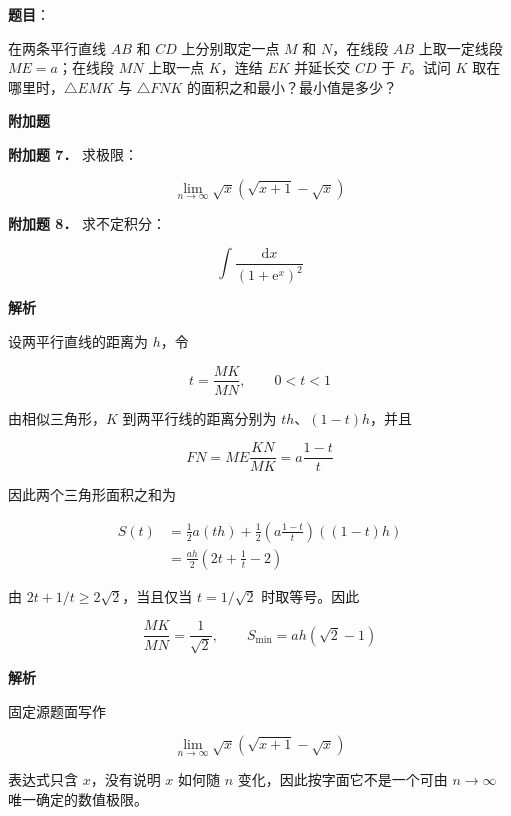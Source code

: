 \begin{answer}

\textbf{题目}：

在两条平行直线 $AB$ 和 $CD$ 上分别取定一点 $M$ 和 $N$，在线段 $AB$ 上取一定线段 $ME=a$；在线段 $MN$ 上取一点 $K$，连结 $EK$ 并延长交 $CD$ 于 $F$。试问 $K$ 取在哪里时，$\triangle EMK$ 与 $\triangle FNK$ 的面积之和最小？最小值是多少？

\begin{gktip}
\Needspace{0.25\textheight}
\textbf{附加题}
\end{gktip}

\textbf{附加题 7．} 求极限：

\nopagebreak[4]
\[
\lim_{n\to\infty}\sqrt{x}\left(\sqrt{x+1}-\sqrt{x}\right)
\]

\textbf{附加题 8．} 求不定积分：

\nopagebreak[4]
\[
\int\frac{\mathrm dx}{(1+\mathrm e^x)^2}
\]

\textbf{解析}

设两平行直线的距离为 $h$，令

\nopagebreak[4]
\[
t=\frac{MK}{MN},\qquad 0<t<1
\]

由相似三角形，$K$ 到两平行线的距离分别为 $th$、$(1-t)h$，并且

\nopagebreak[4]
\[
FN=ME\frac{KN}{MK}=a\frac{1-t}{t}
\]

因此两个三角形面积之和为

\nopagebreak[4]
\[
\begin{aligned}
S(t)&=\frac12a(th)+\frac12\left(a\frac{1-t}{t}\right)((1-t)h)\\
&=\frac{ah}{2}\left(2t+\frac1t-2\right)
\end{aligned}
\]

由 $2t+1/t\ge2\sqrt2$，当且仅当 $t=1/\sqrt2$ 时取等号。因此

\nopagebreak[4]
\[
\frac{MK}{MN}=\frac1{\sqrt2},
\qquad
S_{\min}=ah(\sqrt2-1)
\]


\textbf{解析}

固定源题面写作

\nopagebreak[4]
\[
\lim_{n\to\infty}\sqrt{x}\left(\sqrt{x+1}-\sqrt{x}\right)
\]

表达式只含 $x$，没有说明 $x$ 如何随 $n$ 变化，因此按字面它不是一个可由 $n\to\infty$ 唯一确定的数值极限。


\end{answer}
